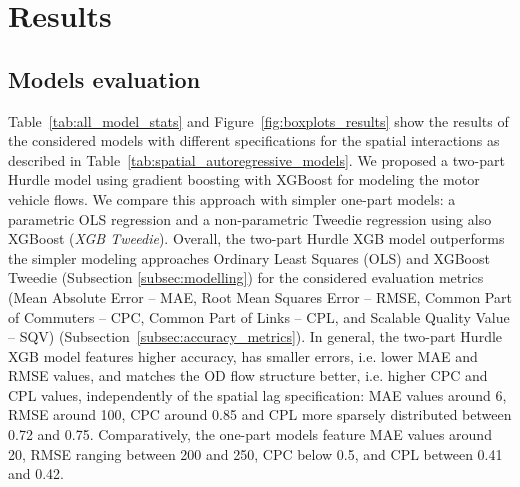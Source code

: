 \section{Results}
\label{sec:ETRCO2H_results}
\subsection{Models evaluation}

Table~\ref{tab:all_model_stats} and Figure~\ref{fig:boxplots_results} show the results of the considered models with different specifications for the spatial interactions as described in Table~\ref{tab:spatial_autoregressive_models}. We proposed a two-part Hurdle model \citep{Mullahy1986SpecificationModels} using gradient boosting \citep{Friedman2001GreedyMachine.} with XGBoost \citep{Chen2016XGBoost:System} for modeling the motor vehicle flows. We compare this approach with simpler one-part models: a parametric OLS regression and a non-parametric Tweedie regression using also XGBoost (\textit{XGB Tweedie}).
Overall, the two-part Hurdle XGB model outperforms the simpler modeling approaches Ordinary Least Squares (OLS) and XGBoost Tweedie \citep{Chen2016XGBoost:System,Krasniqi2022ParametricFrequency} (Subsection \ref{subsec:modelling}) for the considered evaluation metrics (Mean Absolute Error -- MAE, Root Mean Squares Error -- RMSE, Common Part of Commuters -- CPC, Common Part of Links -- CPL, and Scalable Quality Value -- SQV) (Subsection~\ref{subsec:accuracy_metrics}). In general, the two-part Hurdle XGB model features higher accuracy, has smaller errors, i.e. lower MAE and RMSE values, and matches the OD flow structure better, i.e. higher CPC and CPL values, independently of the spatial lag specification: MAE values around 6, RMSE around 100, CPC around 0.85 and CPL more sparsely distributed between 0.72 and 0.75. Comparatively, the one-part models feature MAE values around 20, RMSE ranging between 200 and 250, CPC below 0.5, and CPL between 0.41 and 0.42.



